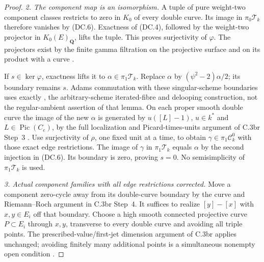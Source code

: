 \begin{proof}
\emph{2. The component map is an isomorphism.}
A tuple of pure weight-two component classes restricts to zero in
$K_0$ of every double curve. Its image in $\pi_0\mathcal T_k$
therefore vanishes by (DC.6). Exactness of (DC.4), followed by the
weight-two projector in $K_0(E)_{\mathbf Q}$, lifts the tuple.
This proves surjectivity of $\varphi$.
The projectors exist by the finite gamma filtration on the
projective surface and on its product with a curve
\citep[Chapter II, Proposition 4.9, Theorem 4.10,
and Remark 8.8.5]{D_Weibel2013KbookII}.

If $s\in\ker\varphi$, exactness lifts it to
$\alpha\in\pi_1\mathcal T_k$.
Replace $\alpha$ by $(\psi^2-2)\alpha/2$; its boundary remains $s$.
Adams commutation with these singular-scheme boundaries uses exactly
\citet[p.~258, paragraph preceding Lemma 2.1]{frC3bcLevine1994},
the arbitrary-scheme iterated-fibre and delooping construction,
not the regular-ambient assertion of that lemma.
On each proper smooth double curve the image of the new $\alpha$
is generated by $u([L]-1)$, $u\in k^*$ and $L\in\operatorname{Pic}(C_e)$,
by the full localization and Picard-times-units argument of C.3br
Step~3 \citep[Section 7, Propositions 2.10 and 3.2]{rootQuillen1973}
\citep[Lemma 5.2 and proof, pp.~395--396]{D_PedriniWeibel1994}.
Use surjectivity of $\rho$, one fixed unit at a time, to obtain
$\gamma\in\pi_1\mathcal C_k^0$ with those exact edge restrictions.
The image of $\gamma$ in $\pi_1\mathcal T_k$ equals $\alpha$ by
the second injection in (DC.6). Its boundary is zero, proving $s=0$.
No semisimplicity of $\pi_1\mathcal T_k$ is used.

\emph{3. Actual component families with all edge restrictions corrected.}
Move a component zero-cycle away from its double-curve boundary by
the curve and Riemann--Roch argument in C.3br Step~4. It suffices to
realize $[y]-[x]$ with $x,y\in E_i$ off that boundary.
Choose a high smooth connected projective curve $P\subset E_i$
through $x,y$, transverse to every double curve and avoiding all
triple points. The prescribed-value/first-jet dimension argument
of C.3br applies unchanged; avoiding finitely many additional
points is a simultaneous nonempty open condition
\citep[Lemma 33.47.3 and proof]{D_StacksBertiniUniformHigher}.


\end{proof}

